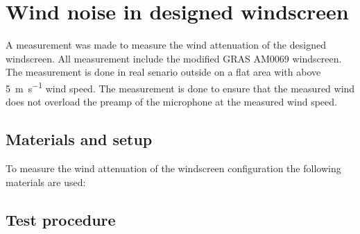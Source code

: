 \chapter{Wind noise in designed windscreen}\label{ap:wind_noise_in_design}
A measurement was made to measure the wind attenuation of the designed windscreen. All measurement include the modified GRAS AM0069 windscreen. The measurement is done in real senario outside on a flat area with above \SI{5}{\meter\per\second} wind speed. The measurement is done to ensure that the measured wind does not overload the preamp of the microphone at the measured wind speed.  


\section*{Materials and setup}
To measure the wind attenuation of the windscreen configuration the following materials are used:

\startequipment
{}
\stopequipment
\startequipment
\stopequipment



\section*{Test procedure}


